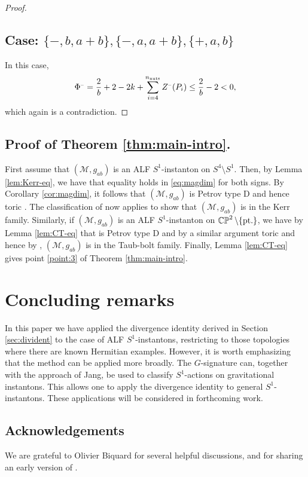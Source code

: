 \documentclass[a4paper,11pt,reqno]{amsart}
\newcommand{\nut}{P}
\newcommand{\cM}{\mathcal{M}}
\theoremstyle{plain}
\DeclareMathOperator{\CP}{\mathbb{C}\mathbb{P}}
\newcommand{\nnuts}{n_{\text{\rm nuts}}}
\newcommand{\M}[1]{{{#1}^{\hspace{-.5pt}\scaleto{-}{4pt}}}}
\numberwithin{equation}{section}
\begin{document}
\begin{proof}
\subsection*{Case: $\{-,b,a+b\},\{-,a,a+b\},\{+,a,b\}$}
In this case, 
\begin{align}
\M{\Phi}
= \frac{2}{b} +2-2k +\sum_{i=4}^{\nnuts}\M{Z}(\nut_i)
\leq \frac{2}{b}-2
<0,
\end{align}
which again is a contradiction.

\end{proof}


\subsection{Proof of Theorem \ref{thm:main-intro}.} 

First assume that $(\cM, g_{ab})$ is an ALF $S^1$-instanton on $S^4 \setminus S^1$. Then, by Lemma \ref{lem:Kerr-eq}, we have that equality holds in \eqref{eq:magdim} for both signs. By Corollary \ref{cor:magdim}, it follows that $(\cM, g_{ab})$ is Petrov type D and hence toric \cite{2013arXiv1302.6975A}. The classification of \cite{Biquard:Gauduchon} now applies to show that $(\cM, g_{ab})$ is in the Kerr family. Similarly, if $(\cM, g_{ab})$ is an ALF $S^1$-instanton on $\CP^2 \setminus \{\text{\rm pt.}\}$, we have by Lemma \ref{lem:CT-eq} that is Petrov type D and by a similar argument toric and hence by \cite{Biquard:Gauduchon}, $(\cM, g_{ab})$ is in the Taub-bolt family. Finally, Lemma \ref{lem:CT-eq} gives point \ref{point:3} of Theorem \ref{thm:main-intro}. 

%

\section{Concluding remarks} 
In this paper we have applied the divergence identity derived in Section \ref{sec:divident} to the case of ALF $S^1$-instantons, restricting to those topologies where there are known Hermitian examples. However, it is worth emphasizing that the method can be applied more broadly. The $G$-signature  can, together with the approach of Jang, be used to classify $S^1$-actions on gravitational instantons. This allows one to apply the divergence identity to general $S^1$-instantons. These applications will be considered in forthcoming work. 

\subsection*{Acknowledgements}
We are grateful to Olivier Biquard for several helpful discussions, and for sharing an early version of \cite{Biquard:Gauduchon}. 
\end{document}
